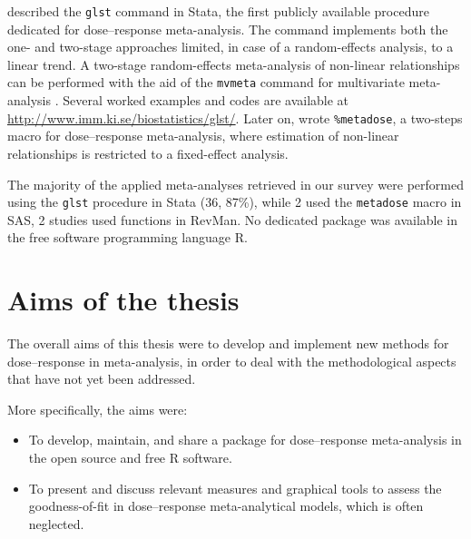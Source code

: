 \documentclass[11pt,a4paper,twoside,openany]{book}\usepackage{knitr}
\begin{document}
{{\cite{orsini2006generalized} described the \texttt{glst} command in Stata, the first publicly available procedure dedicated for dose--response meta-analysis. The command implements both the one- and two-stage approaches limited, in case of a random-effects analysis, to a linear trend. A two-stage random-effects meta-analysis of non-linear relationships can be performed with the aid of the \texttt{mvmeta} command for multivariate meta-analysis \citep{white2011multivariate}. Several worked examples and codes are available at \url{http://www.imm.ki.se/biostatistics/glst/}. Later on, \cite{li2010sas} wrote \texttt{\%metadose}, a two-steps macro for dose--response meta-analysis, where estimation of non-linear relationships is restricted to a fixed-effect analysis.

The majority of the applied meta-analyses retrieved in our survey were performed using the \texttt{glst} procedure in Stata (36, 87\%), while 2 used the \texttt{metadose} macro in SAS, 2 studies used functions in RevMan. No dedicated package was available in the free software programming language \textsf{R}. 




%

\chapter{Aims of the thesis}

The overall aims of this thesis were to develop and implement new methods for dose--response in meta-analysis, in order to deal with the methodological aspects that have not yet been addressed.

\bigskip

More specifically, the aims were:

\begin{itemize}
\item To develop, maintain, and share a package for dose--response meta-analysis in the open source and free \textsf{R} software.

\item To present and discuss relevant measures and graphical tools to assess the goodness-of-fit in dose--response meta-analytical models, which is often neglected.


\end{itemize}}}
\end{document}
